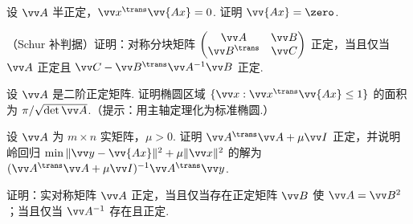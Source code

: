 {\begin{exB}
			\item\label{ex:quad:B12} 设 $\vv A$ 半正定，$\vv x^\trans\vv{Ax}=0$. 证明 $\vv{Ax}=\zero$.
			\item\label{ex:quad:B13} （Schur 补判据）证明：对称分块矩阵 $\begin{pmatrix}\vv A&\vv B\\ \vv B^\trans&\vv C\end{pmatrix}$ 正定，当且仅当 $\vv A$ 正定且 $\vv C-\vv B^\trans\vv A^{-1}\vv B$ 正定.
			\item\label{ex:quad:B14} 设 $\vv A$ 是二阶正定矩阵. 证明椭圆区域 $\{\vv x:\vv x^\trans\vv{Ax}\le1\}$ 的面积为 $\pi/\sqrt{\det\vv A}$.（提示：用主轴定理化为标准椭圆.）
			\item\label{ex:quad:B15} 设 $\vv A$ 为 $m\times n$ 实矩阵，$\mu>0$. 证明 $\vv A^\trans\vv A+\mu\vv I$ 正定，并说明岭回归 $\min\|\vv y-\vv{Ax}\|^2+\mu\|\vv x\|^2$ 的解为 $(\vv A^\trans\vv A+\mu\vv I)^{-1}\vv A^\trans\vv y$.
			\item\label{ex:quad:B16} 证明：实对称矩阵 $\vv A$ 正定，当且仅当存在正定矩阵 $\vv B$ 使 $\vv A=\vv B^2$；当且仅当 $\vv A^{-1}$ 存在且正定.
		\end{exB}
		
}
